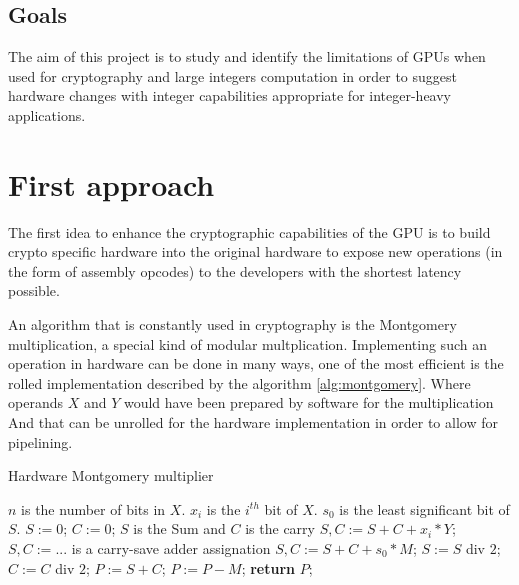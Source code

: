 \documentclass{report}
\begin{document}
\section{Goals}
    The aim of this project is to study and identify the limitations of GPUs
    when used for cryptography and large integers computation in order to suggest
    hardware changes with integer capabilities appropriate for integer-heavy applications.

\chapter{First approach}
    The first idea to enhance the cryptographic capabilities of the GPU is to
    build crypto specific hardware into the original hardware to expose new 
    operations (in the form of assembly opcodes) to the developers with the 
    shortest latency possible. 
    
    An algorithm that is constantly used in cryptography is the Montgomery multiplication,
    a special kind of modular multplication. Implementing such an operation in hardware can
    be done in many ways, one of the most efficient is the rolled implementation described
    by the algorithm \ref{alg:montgomery}. Where operands $X$ and $Y$ would have been prepared
    by software for the multiplication And that can be unrolled for the hardware implementation
    in order to allow for pipelining.
    
    \begin{algorithm}
    \caption{Hardware Montgomery multiplier\cite{montgomeryHard}}\label{alg:montgomery}
    \begin{algorithmic}[1]
        \Statex $n$ is the number of bits in $X$.
        \Statex $x_i$ is the $i^{th}$ bit of $X$.
        \Statex $s_0$ is the least significant bit of $S$. 		
        \State $S := 0$; $C := 0$; \Comment $S$ is the Sum and $C$ is the carry
            \State $S,C := S + C + x_i * Y$; \Comment $S,C := ...$ is a carry-save adder assignation
            \State $S,C := S + C + s_0 * M$;
            \State $S := S$ div $2$; $C := C$ div $2$;  
        \EndFor
        \State $P := S + C$;
            \State $P := P - M$;
        \EndIf
        \State \textbf{return} $P$;
    \end{algorithmic}
    \end{algorithm}
    
\end{document}
